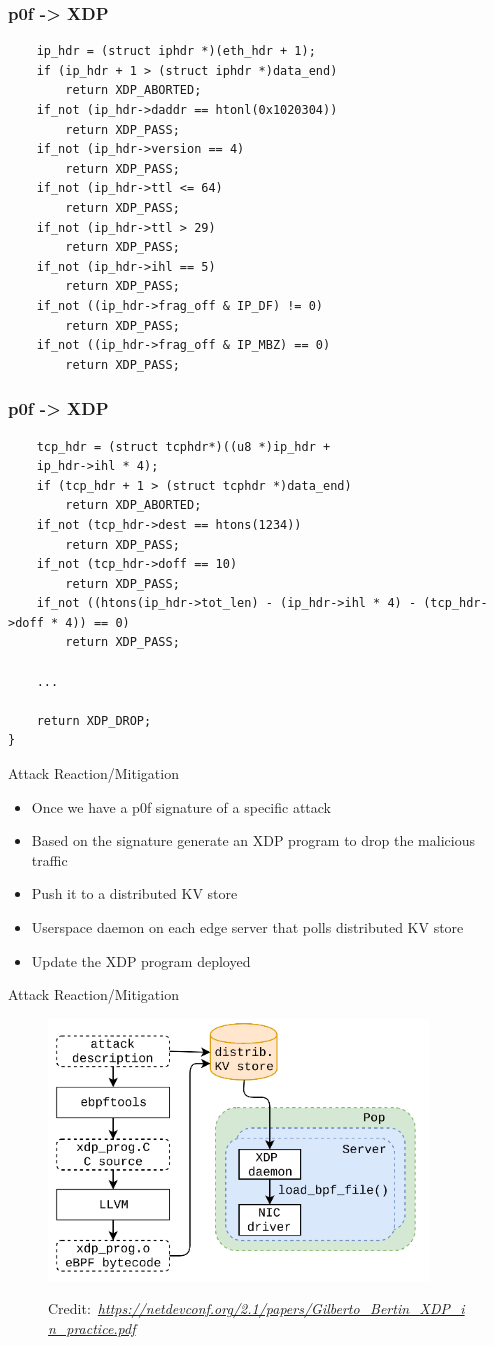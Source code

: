 \documentclass{beamer}
\newcommand{\credit}[1]{\par\hfill \tiny Credit:~\itshape#1}
\begin{document}
\begin{frame}[fragile]
\frametitle{p0f -> XDP}
\begin{verbatim}
    ip_hdr = (struct iphdr *)(eth_hdr + 1);
    if (ip_hdr + 1 > (struct iphdr *)data_end)
        return XDP_ABORTED;
    if_not (ip_hdr->daddr == htonl(0x1020304))
        return XDP_PASS;
    if_not (ip_hdr->version == 4)
        return XDP_PASS;
    if_not (ip_hdr->ttl <= 64)
        return XDP_PASS;
    if_not (ip_hdr->ttl > 29)
        return XDP_PASS;
    if_not (ip_hdr->ihl == 5)
        return XDP_PASS;
    if_not ((ip_hdr->frag_off & IP_DF) != 0)
        return XDP_PASS;
    if_not ((ip_hdr->frag_off & IP_MBZ) == 0)
        return XDP_PASS;
\end{verbatim}
\end{frame}

\begin{frame}[fragile]
  \frametitle{p0f -> XDP}
  \begin{verbatim}
    tcp_hdr = (struct tcphdr*)((u8 *)ip_hdr +
    ip_hdr->ihl * 4);
    if (tcp_hdr + 1 > (struct tcphdr *)data_end)
        return XDP_ABORTED;
    if_not (tcp_hdr->dest == htons(1234))
        return XDP_PASS;
    if_not (tcp_hdr->doff == 10)
        return XDP_PASS;
    if_not ((htons(ip_hdr->tot_len) - (ip_hdr->ihl * 4) - (tcp_hdr->doff * 4)) == 0)
        return XDP_PASS;

    ...

    return XDP_DROP;
}
  \end{verbatim}
\end{frame}

\begin{frame}{Attack Reaction/Mitigation}
  \begin{itemize}
    \item Once we have a p0f signature of a specific attack
    \item Based on the signature generate an XDP program to drop the malicious traffic
    \item Push it to a distributed KV store
    \item Userspace daemon on each edge server that polls distributed KV store
    \item Update the XDP program deployed
  \end{itemize}
\end{frame}

\begin{frame}{Attack Reaction/Mitigation}
  \begin{figure}
    \includegraphics[width=0.9\textwidth]{./xdp_reaction.png}
    \credit{\url{https://netdevconf.org/2.1/papers/Gilberto_Bertin_XDP_in_practice.pdf}}
  \end{figure}
\end{frame}
\end{document}
